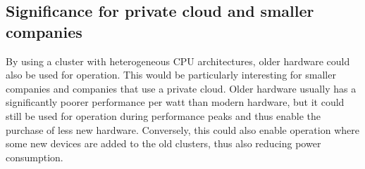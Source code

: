 \subsection{Significance for private cloud and smaller companies}
By using a cluster with heterogeneous CPU architectures, older hardware could
also be used for operation. This would be particularly interesting for smaller
companies and companies that use a private cloud. Older hardware usually has a
significantly poorer performance per watt than modern hardware, but it could
still be used for operation during performance peaks and thus enable the
purchase of less new hardware.  Conversely, this could also enable operation
where some new devices are added to the old clusters, thus also reducing power
consumption.
